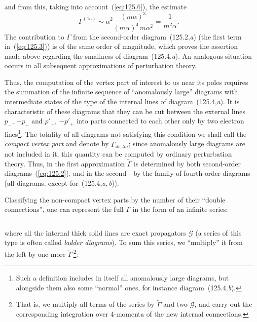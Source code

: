 
\noindent and from this, taking into account~(\ref{eq:125.6}), the estimate
\[
\Gamma^{(1a)} \sim \alpha^2 \frac{(m\alpha)^3}{(m\alpha)^4\,m\alpha^2} = \frac{1}{m^2\alpha}.
\]
The contribution to $\Gamma$ from the second-order diagram~(125.2,\textit{a}) (the first term in~(\ref{eq:125.3})) is of the same order of magnitude, which proves the assertion made above regarding the smallness of diagram~(125.4,\textit{a}). An analogous situation occurs in all subsequent approximations of perturbation theory.

Thus, the computation of the vertex part of interest to us near its poles requires the summation of the infinite sequence of ``anomalously large'' diagrams with intermediate states of the type of the internal lines of diagram~(125.4,\textit{a}). It is characteristic of these diagrams that they can be cut between the external lines $p_-$, $-p_+$ and $p'_-$, $-p'_+$ into parts connected to each other only by two electron lines\footnote{Such a definition includes in itself all anomalously large diagrams, but alongside them also some ``normal'' ones, for instance diagram~(125.4,\textit{b}).}. The totality of all diagrams not satisfying this condition we shall call the \emph{compact vertex part} and denote by $\widetilde{\Gamma}_{ik,\,lm}$; since anomalously large diagrams are not included in it, this quantity can be computed by ordinary perturbation theory. Thus, in the first approximation $\widetilde{\Gamma}$ is determined by both second-order diagrams~(\ref{eq:125.2}), and in the second---by the family of fourth-order diagrams (all diagrams, except for~(125.4,\textit{a},\,\textit{b})).

Classifying the non-compact vertex parts by the number of their ``double connections'', one can represent the full $\Gamma$ in the form of an infinite series:


\begin{equation}
\label{eq:125.9}
\end{equation}

\noindent where all the internal thick solid lines are exact propagators $\mathcal{G}$ (a series of this type is often called \emph{ladder diagrams}). To sum this series, we ``multiply'' it from the left by one more $\widetilde{\Gamma}$\,\footnote{That is, we multiply all terms of the series by $\widetilde{\Gamma}$ and two $\mathcal{G}$, and carry out the corresponding integration over 4-momenta of the new internal connections.}:

